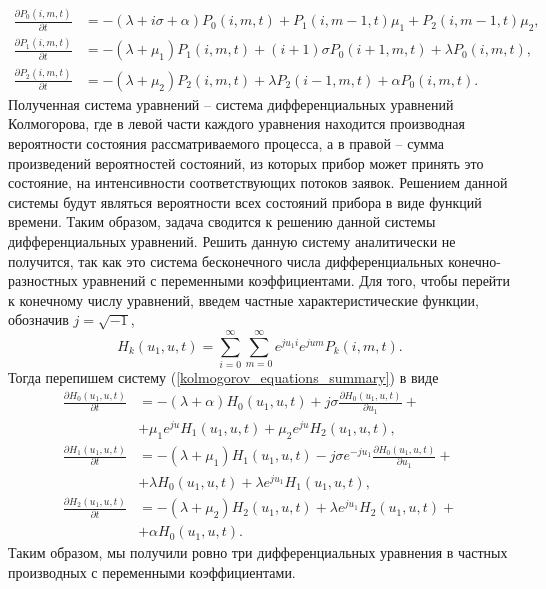 \begin{equation} \label{kolmogorov_equations_summary}
	\begin{split}
		\frac{{\partial P_{0}(i,m,t)}}{{\partial t}} &= -(\lambda + i\sigma + \alpha)P_{0}(i,m,t) + P_{1}(i,m-1,t)\mu_{1} + P_{2}(i,m-1,t)\mu_{2},
		\\
		\frac{{\partial P_{1}(i,m,t)}}{{\partial t}} &= -(\lambda + \mu_{1})P_{1}(i,m,t) + (i+1)\sigma P_{0}(i+1,m,t) + \lambda  P_{0}(i,m,t),
		\\
		\frac{{\partial P_{2}(i,m,t)}}{{\partial t}} &= -(\lambda + \mu_{2})P_{2}(i,m,t) + \lambda P_{2}(i-1,m,t) + \alpha  P_{0}(i,m,t).
	\end{split}
\end{equation}	
Полученная система уравнений – система дифференциальных уравнений Колмогорова, где в левой части каждого уравнения находится производная вероятности состояния рассматриваемого процесса, а в правой – сумма произведений вероятностей состояний, из которых прибор может принять это состояние, на интенсивности соответствующих потоков заявок. Решением данной системы будут являться вероятности всех состояний прибора в виде функций времени. Таким образом, задача сводится к решению данной системы дифференциальных уравнений.
Решить данную систему аналитически не получится, так как это система бесконечного числа дифференциальных конечно-разностных уравнений с переменными коэффициентами. 
Для того, чтобы перейти к конечному числу уравнений, введем частные характеристические функции, обозначив $j=\sqrt{-1}$,
\begin{equation*}
	H_{k}(u_{1},u,t) = \sum_{i=0}^{\infty}
	\sum_{m=0}^{\infty}  
	e^{ju_{1}i}e^{jum} P_{k}(i,m,t).
\end{equation*}
Тогда перепишем систему (\ref{kolmogorov_equations_summary}) в виде
\begin{equation} \label{characteristic_equations_summary}
	\begin{split}
		\frac{{\partial H_{0}(u_{1},u,t)}}{{\partial t}} &= -(\lambda + \alpha)H_{0}(u_{1},u,t) + j\sigma
		\frac{{\partial H_{0}(u_{1},u,t)}}{{\partial u_{1}}} +\\  &+ \mu_{1} e^{ju}H_{1}(u_{1},u,t) + \mu_{2}e^{ju}H_{2}(u_{1},u,t) ,
		\\
		\frac{{\partial H_{1}(u_{1},u,t)}}{{\partial t}} &= -(\lambda + \mu_{1})H_{1}(u_{1},u,t) - j\sigma e^{-ju_{1}}
		\frac{{\partial H_{0}(u_{1},u,t)}}{{\partial u_{1}}} +\\  &+ \lambda H_{0}(u_{1},u,t) + \lambda e^{ju_{1}}H_{1}(u_{1},u,t) ,
		\\
		\frac{{\partial H_{2}(u_{1},u,t)}}{{\partial t}} &= -(\lambda + \mu_{2})H_{2}(u_{1},u,t)  + \lambda e^{ju_{1}}H_{2}(u_{1},u,t) +\\  &+ \alpha H_{0}(u_{1},u,t).
	\end{split}
\end{equation}  
Таким образом, мы получили ровно три дифференциальных уравнения в частных производных с переменными коэффициентами.
